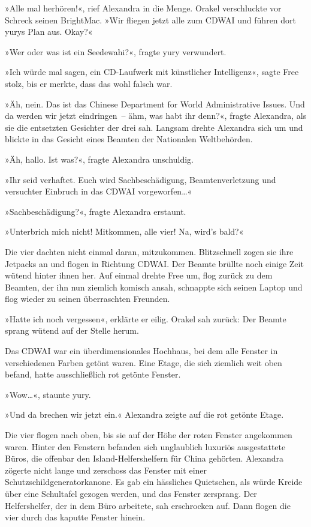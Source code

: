 »Alle mal herhören!«, rief Alexandra in die Menge. Orakel verschluckte vor Schreck seinen BrightMac. »Wir fliegen jetzt alle zum CDWAI und führen dort yurys Plan aus. Okay?«

»Wer oder was ist ein Seedewahi?«, fragte yury verwundert.

»Ich würde mal sagen, ein CD-Laufwerk mit künstlicher Intelligenz«, sagte Free stolz, bis er merkte, dass das wohl falsch war.

»Äh, nein. Das ist das Chinese Department for World Administrative Issues. Und da werden wir jetzt eindringen~– ähm, was habt ihr denn?«, fragte Alexandra, als sie die entsetzten Gesichter der drei sah. Langsam drehte Alexandra sich um und blickte in das Gesicht eines Beamten der Nationalen Weltbehörden.

»Äh, hallo. Ist was?«, fragte Alexandra unschuldig.

»Ihr seid verhaftet. Euch wird Sachbeschädigung, Beamtenverletzung und versuchter Einbruch in das CDWAI vorgeworfen…«

»Sachbeschädigung?«, fragte Alexandra erstaunt.

»Unterbrich mich nicht! Mitkommen, alle vier! Na, wird’s bald?«

Die vier dachten nicht einmal daran, mitzukommen. Blitzschnell zogen sie ihre Jetpacks an und flogen in Richtung CDWAI. Der Beamte brüllte noch einige Zeit wütend hinter ihnen her. Auf einmal drehte Free um, flog zurück zu dem Beamten, der ihn nun ziemlich komisch ansah, schnappte sich seinen Laptop und flog wieder zu seinen überraschten Freunden.

»Hatte ich noch vergessen«, erklärte er eilig. Orakel sah zurück: Der Beamte sprang wütend auf der Stelle herum.

Das CDWAI war ein überdimensionales Hochhaus, bei dem alle Fenster in verschiedenen Farben getönt waren. Eine Etage, die sich ziemlich weit oben befand, hatte ausschließlich rot getönte Fenster.

»Wow…«, staunte yury.

»Und da brechen wir jetzt ein.« Alexandra zeigte auf die rot getönte Etage.

Die vier flogen nach oben, bis sie auf der Höhe der roten Fenster angekommen waren. Hinter den Fenstern befanden sich unglaublich luxuriös ausgestattete Büros, die offenbar den Island-Helfershelfern für China gehörten. Alexandra zögerte nicht lange und zerschoss das Fenster mit einer Schutzschildgeneratorkanone. Es gab ein hässliches Quietschen, als würde Kreide über eine Schultafel gezogen werden, und das Fenster zersprang. Der Helfershelfer, der in dem Büro arbeitete, sah erschrocken auf. Dann flogen die vier durch das kaputte Fenster hinein.

